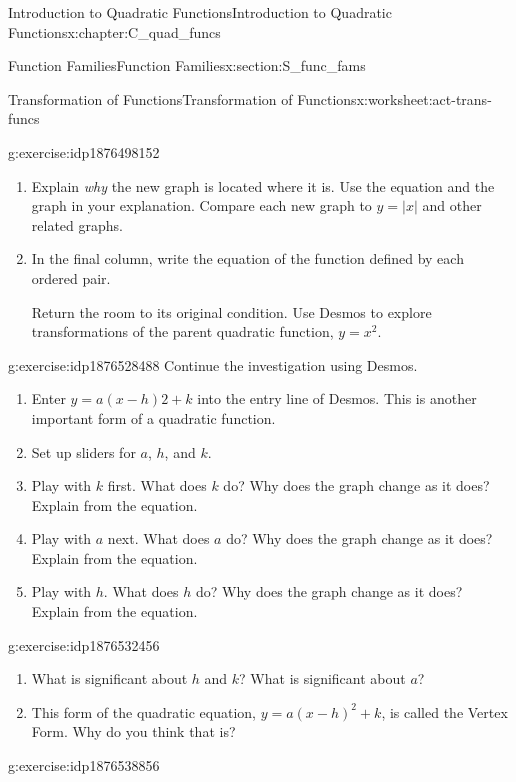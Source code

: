 \documentclass[oneside,10pt,]{book}
\numberwithin{equation}{chapter}
\begin{document}
\begin{chapterptx}{Introduction to Quadratic Functions}{}{Introduction to Quadratic Functions}{}{}{x:chapter:C_quad_funcs}
\begin{sectionptx}{Function Families}{}{Function Families}{}{}{x:section:S_func_fams}
\begin{worksheet-subsection}{Transformation of Functions}{}{Transformation of Functions}{}{}{x:worksheet:act-trans-funcs}
\begin{divisionexercise}{4}{}{}{g:exercise:idp1876498152}
\begin{enumerate}[font=\bfseries,label=(\alph*),ref=\alph*]
\begin{tableptx}{\textbf{}}{x:table:tbl-transform}{}
{\begin{tabular}{Accccc}
\end{tabular}
}%
\end{tableptx}%
\item{}Explain \emph{why} the new graph is located where it is. Use the equation and the graph in your explanation. Compare each new graph to \(y = |x|\) and other related graphs.%
\item{}In the final column, write the equation of the function defined by each ordered pair.%
\par
Return the room to its original condition. Use Desmos to explore transformations of the parent quadratic function, \(y = x^2\).%
\end{enumerate}
\end{divisionexercise}%
\begin{divisionexercise}{5}{}{}{g:exercise:idp1876528488}%
Continue the investigation using Desmos.%
\begin{enumerate}[font=\bfseries,label=(\alph*),ref=\alph*]
\item{}Enter \(y = a(x - h)2 + k\) into the entry line of Desmos. This is another important form of a quadratic function.%
\item{}Set up sliders for \(a\), \(h\), and \(k\).%
\item{}Play with \(k\) first. What does \(k\) do? Why does the graph change as it does? Explain from the equation.%
\item{}Play with \(a\) next. What does \(a\) do? Why does the graph change as it does? Explain from the equation.%
\item{}Play with \(h\). What does \(h\) do? Why does the graph change as it does? Explain from the equation.%
\end{enumerate}
\end{divisionexercise}%
\begin{divisionexercise}{6}{}{}{g:exercise:idp1876532456}%
\begin{enumerate}[font=\bfseries,label=(\alph*),ref=\alph*]
\item{}What is significant about \(h\) and \(k\)? What is significant about \(a\)?%
\item{}This form of the quadratic equation, \(y = a(x - h)^2 + k\), is called the Vertex Form. Why do you think that is?%
\end{enumerate}
\end{divisionexercise}%
\begin{divisionexercise}{7}{}{}{g:exercise:idp1876538856}%

\end{divisionexercise}
\end{worksheet-subsection}
\end{sectionptx}
\end{chapterptx}
\end{document}

